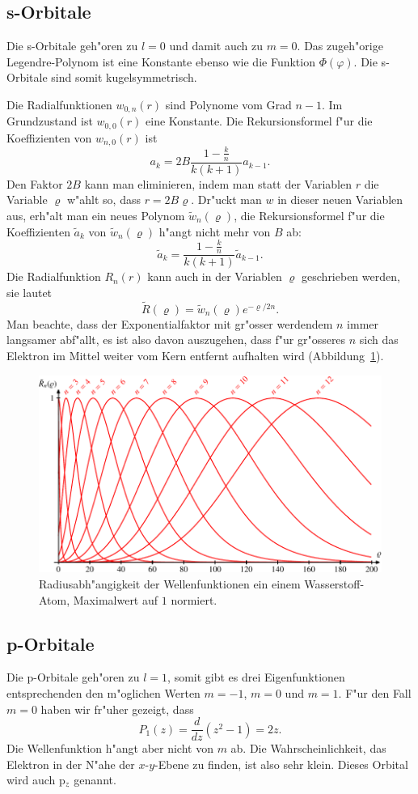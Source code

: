 \subsection{s-Orbitale}
Die s-Orbitale geh"oren zu $l=0$ und damit auch zu $m=0$.
Das zugeh"orige Legendre-Polynom ist eine Konstante ebenso wie die
Funktion $\Phi(\varphi)$.
Die s-Orbitale sind somit kugelsymmetrisch.

Die Radialfunktionen $w_{0,n}(r)$ sind Polynome vom Grad $n-1$.
Im Grundzustand ist $w_{0,0}(r)$ eine Konstante.
Die Rekursionsformel f"ur die Koeffizienten von $w_{n,0}(r)$ ist
\[
a_k=2B\frac{1-\frac{k}{n}}{k(k+1)}a_{k-1}.
\]
Den Faktor $2B$ kann man eliminieren, indem man statt der Variablen $r$
die Variable $\varrho$ w"ahlt so, dass $r=2B \varrho$.
Dr"uckt man $w$ in dieser neuen Variablen aus, erh"alt man ein neues
Polynom $\tilde w_{n}(\varrho)$, die Rekursionsformel f"ur die 
Koeffizienten $\tilde a_k$ von $\tilde w_n(\varrho)$ h"angt nicht mehr
von $B$ ab:
\[
\tilde a_k = \frac{1-\frac{k}{n}}{k(k+1)}\tilde a_{k-1}.
\]
Die Radialfunktion $R_n(r)$ kann auch in der Variablen $\varrho$
geschrieben werden, sie lautet
\[
\tilde R(\varrho)=\tilde w_n(\varrho)e^{-\varrho/2n}.
\]
Man beachte, dass der Exponentialfaktor mit gr"osser werdendem $n$ immer
langsamer abf"allt, es ist also davon auszugehen, dass f"ur gr"osseres
$n$ sich das Elektron im Mittel weiter vom Kern entfernt aufhalten wird
(Abbildung~\ref{skript:radialgraphs}).
\begin{figure}
\centering
\includegraphics[width=\hsize]{graphics/radial-1.pdf}
\caption{Radiusabh"angigkeit der Wellenfunktionen ein einem Wasserstoff-Atom,
Maximalwert auf $1$ normiert.
\label{skript:radialgraphs}}
\end{figure}

\subsection{p-Orbitale}
Die p-Orbitale geh"oren zu $l=1$, somit gibt es drei Eigenfunktionen
entsprechenden den m"oglichen Werten $m=-1$, $m=0$ und $m=1$.
F"ur den Fall $m=0$ haben wir fr"uher gezeigt, dass
\[
P_1(z)=\frac{d}{dz}(z^2-1)=2z.
\]
Die Wellenfunktion h"angt aber nicht von $m$ ab.
Die Wahrscheinlichkeit, das Elektron in der N"ahe der $x$-$y$-Ebene
zu finden, ist also sehr klein.
Dieses Orbital wird auch p$\mathstrut_z$ genannt.

